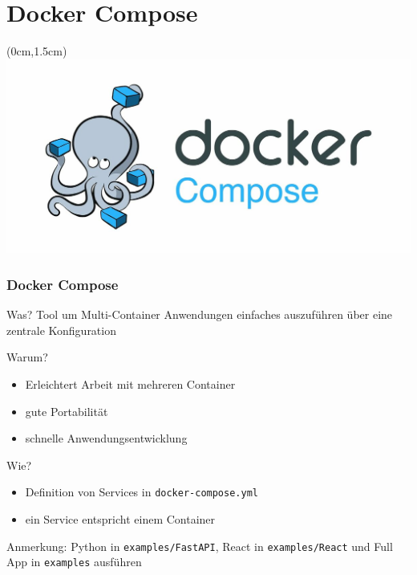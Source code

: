 \documentclass[22pt]{beamer}
\newcommand{\code}[1]{\colorbox{gray!15}{\texttt{#1}}}
\begin{document}
\section{Docker Compose}
\begin{frame}[plain]
    \begin{textblock*}{\paperwidth}(0cm,1.5cm) %
        \includegraphics[width=\paperwidth]{Bilder/1200px-Docker-compose-logo.jpg}
    \end{textblock*}
\end{frame}

\begin{frame}[t]
    \frametitle{Docker Compose}
    \begin{block}{Was?}
        Tool um Multi-Container Anwendungen einfaches auszuführen
        über eine zentrale Konfiguration
    \end{block}\pause
    \begin{block}{Warum?}
        \begin{itemize}
            \item Erleichtert Arbeit mit mehreren Container
            \item gute Portabilität
            \item schnelle Anwendungsentwicklung
        \end{itemize}
    \end{block}\pause
    \begin{block}{Wie?}
        \begin{itemize}
            \item Definition von Services in \code{docker-compose.yml}
            \item ein Service entspricht einem Container
        \end{itemize}
    \end{block}
    \medskip
    \footnotesize Anmerkung: Python in \code{examples/FastAPI}, React in \code{examples/React} und Full App in \code{examples} ausführen
\end{frame}
\end{document}
